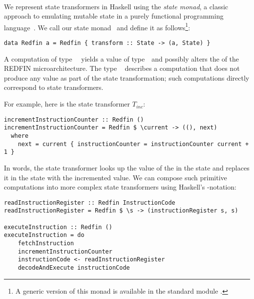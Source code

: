 
\vspace{-1mm}
\noindent\hrulefill~\\
\vspace{-3mm}

We represent state transformers in Haskell using the \emph{state monad}, a
classic approach to emulating mutable state in a purely functional programming
language~\cite{wadler1990comprehending}. We call our state monad~ and
define it as follows\footnote{A generic version of this monad is available in
the standard module .}:

\vspace{1mm}
\begin{verbatim}
data Redfin a = Redfin { transform :: State -> (a, State) }
\end{verbatim}
\vspace{1mm}

\noindent
A computation of type~~ yields a value of type~~and
possibly alters the  of the REDFIN microarchitecture.
The type ~\hs{()} describes a computation that does not produce any
value as part of the state transformation; such computations directly correspond
to state transformers.

\noindent
For example, here is the state transformer $T_\textit{inc}$:

\vspace{1mm}
\begin{verbatim}
incrementInstructionCounter :: Redfin ()
incrementInstructionCounter = Redfin $ \current -> ((), next)
  where
    next = current { instructionCounter = instructionCounter current + 1 }
\end{verbatim}
\vspace{1mm}

\noindent
In words, the state transformer looks up the value of the 
in the  state and replaces it in the  state with the
incremented value. We can compose such primitive computations into more complex
state transformers using Haskell's -notation:

\vspace{1mm}
\begin{verbatim}
readInstructionRegister :: Redfin InstructionCode
readInstructionRegister = Redfin $ \s -> (instructionRegister s, s)

executeInstruction :: Redfin ()
executeInstruction = do
    fetchInstruction
    incrementInstructionCounter
    instructionCode <- readInstructionRegister
    decodeAndExecute instructionCode
\end{verbatim}
\vspace{1mm}


